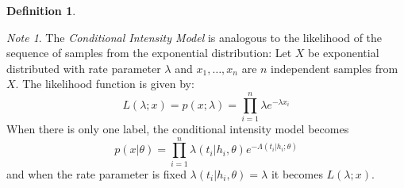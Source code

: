 \documentclass[12pt]{article}
\theoremstyle{plain}
\theoremstyle{definition}
\newtheorem{definition}{Definition}
\theoremstyle{remark}
\newtheorem*{note}{Note}
\begin{document}
\begin{definition}
\begin{note}
  The \emph{Conditional Intensity Model} is analogous to the likelihood of the
  sequence of samples from the exponential distribution:
  Let $X$ be exponential distributed with rate parameter $\lambda$ and
  $x_1,\dots,x_n$ are $n$ independent samples from $X$.
  The likelihood function is given by:
  \begin{equation*}
    L(\lambda;x) = p(x;\lambda) = \prod_{i=1}^n\lambda e^{-\lambda x_i}
  \end{equation*}
  When there is only one label, the conditional intensity model becomes
  \begin{equation*}
    p(x|\theta) = \prod_{i=1}^n\lambda(t_i|h_i,\theta)
    e^{-\Lambda(t_i|h_i;\theta)}
  \end{equation*}
  and when the rate parameter is fixed $\lambda(t_i|h_i,\theta) = \lambda$ it
  becomes $L(\lambda;x)$.
\end{note}

\end{definition}



\end{document}
